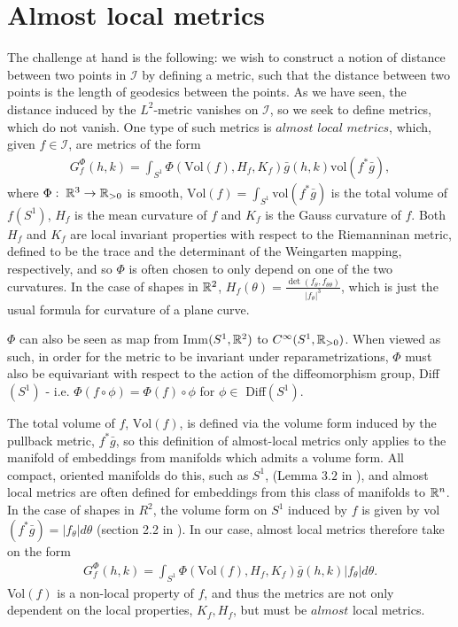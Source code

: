 \section{Almost local metrics}
\label{sec:al-metrics}

The challenge at hand is the following: we wish to construct a notion of distance between two points in $\mathcal{I}$ by defining a metric, such that the distance between two points is the length of geodesics between the points. As we have seen, the distance induced by the $L^2$-metric vanishes on $\mathcal{I}$, so we seek to define metrics, which do not vanish. One type of such metrics is $\textit{almost local metrics}$, which, given $f \in \mathcal{I}$, are metrics of the form
\begin{align*}
G_f^\Phi (h,k) = \int_{S^1} \Phi(\text{Vol}(f), H_f, K_f) \bar{g}(h,k) \text{vol}(f^* \bar{g}),
\end{align*}
where $\Phi: \; \mathbb{R}^3 \rightarrow \mathbb{R}_{> 0}$ is smooth, $\text{Vol}(f) = \int_{S^1} \text{vol}(f^* \bar{g})$ is the total volume of $f(S^1)$, $H_f$ is the mean curvature of $f$ and $K_f$ is the Gauss curvature of $f$. Both $H_f$ and $K_f$ are local invariant properties with respect to the Riemanninan metric, defined to be the trace and the determinant of the Weingarten mapping, respectively, and so $\Phi$ is often chosen to only depend on one of the two curvatures. In the case of shapes in $\mathbb{R}^2$, $H_f(\theta) = \frac{\det(f_\theta, f_{\theta \theta})}{\left| f_\theta \right| ^3}$, which is just the usual formula for curvature of a plane curve.

$\Phi$ can also be seen as map from Imm$(S^1, \mathbb{R}^2)$ to $C^\infty (S^1, \mathbb{R}_{> 0})$. When viewed as such, in order for the metric to be invariant under reparametrizations, $\Phi$ must also be equivariant with respect to the action of the diffeomorphism group, Diff$(S^1)$ - i.e. $\Phi(f \circ \phi) = \Phi(f) \circ \phi$ for $\phi \in$ Diff$(S^1)$.

The total volume of $f$, $\text{Vol}(f)$, is defined via the volume form induced by the pullback metric, $f^*\bar{g}$, so this definition of almost-local metrics only applies to the manifold of embeddings from manifolds which admits a volume form. All compact, oriented manifolds do this, such as $S^1$, (Lemma $3.2$ in \cite{lee2006riemannian}), and almost local metrics are often defined for embeddings from this class of manifolds to $\mathbb{R}^n$. In the case of shapes in $R^2$, the volume form on $S^1$ induced by $f$ is given by vol$(f^*\bar{g}) = \left| f_\theta \right| d \theta$ (section 2.2 in \cite{michor2003riemannian}). In our case, almost local metrics therefore take on the form
\begin{align*}
G_f^\Phi (h,k) = \int_{S^1} \Phi(\text{Vol}(f), H_f, K_f) \bar{g}(h,k) \left| f_\theta \right| d \theta.
\end{align*}
Vol$(f)$ is a non-local property of $f$, and thus the metrics are not only dependent on the local properties, $K_f, H_f$, but must be $\textit{almost}$ local metrics.

